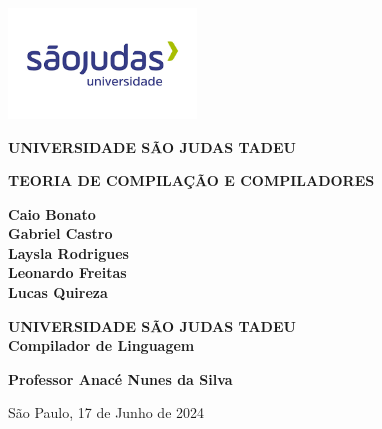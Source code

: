 \documentclass[a4paper,12pt]{article}
\begin{document}
\begin{center}
\includegraphics[width=5cm]{saoJudas.png}

\Large \textbf{UNIVERSIDADE SÃO JUDAS TADEU }


\vspace{7.5cm}

\textbf{TEORIA DE COMPILAÇÃO E COMPILADORES}

\vspace{6.5cm}

    \textbf{Caio Bonato \\ Gabriel Castro \\Laysla Rodrigues  \\ 
    Leonardo Freitas \\ Lucas Quireza }\\


\newpage

\newpage

\thispagestyle{empty}
\begin{center}
    \vspace*{1cm}
    \textbf{UNIVERSIDADE SÃO JUDAS TADEU}\\
    \vspace*{1cm}
    \Huge
    \textbf{Compilador de Linguagem}

    \vspace*{8cm}

\LARGE
\begin{flushright}
     \textbf{Professor Anacé Nunes da Silva}
     \end{flushright}

    

    
    
    \vspace{0.5cm}
    \LARGE
    
    
    \vfill





    
    \vfill
    \center
    \Large
    São Paulo, 17 de Junho de 2024 
    
    \end{center}
    
\newpage



\end{center}
\newpage
\end{document}
